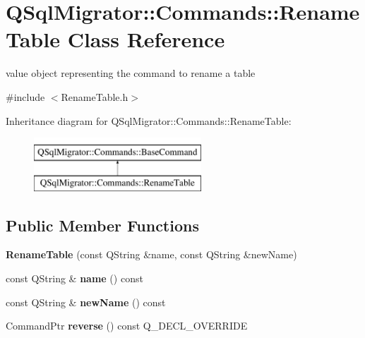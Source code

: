 \hypertarget{class_q_sql_migrator_1_1_commands_1_1_rename_table}{}\section{Q\+Sql\+Migrator\+:\+:Commands\+:\+:Rename\+Table Class Reference}
\label{class_q_sql_migrator_1_1_commands_1_1_rename_table}


value object representing the command to rename a table  




{\ttfamily \#include $<$Rename\+Table.\+h$>$}

Inheritance diagram for Q\+Sql\+Migrator\+:\+:Commands\+:\+:Rename\+Table\+:\begin{figure}[H]
\begin{center}
\leavevmode
\includegraphics[height=2.000000cm]{class_q_sql_migrator_1_1_commands_1_1_rename_table}
\end{center}
\end{figure}
\subsection*{Public Member Functions}
\begin{DoxyCompactItemize}
\item 
\mbox{\label{class_q_sql_migrator_1_1_commands_1_1_rename_table_a2ae7d0d5801c132af4f8333cd573400d}} 
{\bfseries Rename\+Table} (const Q\+String \&name, const Q\+String \&new\+Name)
\item 
\mbox{\label{class_q_sql_migrator_1_1_commands_1_1_rename_table_a41b1f78ca48a8228bb4a362f905ece27}} 
const Q\+String \& {\bfseries name} () const
\item 
\mbox{\label{class_q_sql_migrator_1_1_commands_1_1_rename_table_ab137579dd492c2be8d5e0e0af7a73990}} 
const Q\+String \& {\bfseries new\+Name} () const
\item 
\mbox{\label{class_q_sql_migrator_1_1_commands_1_1_rename_table_a50375a60ddd835c09f8aca2f593b7db5}} 
Command\+Ptr {\bfseries reverse} () const Q\+\_\+\+D\+E\+C\+L\+\_\+\+O\+V\+E\+R\+R\+I\+DE
\end{DoxyCompactItemize}
